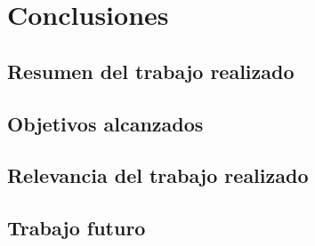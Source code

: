 
\chapter{Conclusiones}
\label{sec-5}

\label{cap:conclusiones}

\section{Resumen del trabajo realizado}
\label{sec-5.1}

\section{Objetivos alcanzados}
\label{sec-5.2}

\section{Relevancia del trabajo realizado}
\label{sec-5.3}

\section{Trabajo futuro}
\label{sec-5.4}
